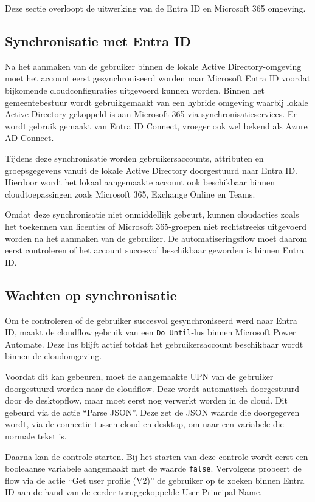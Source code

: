 Deze sectie overloopt de uitwerking van de Entra ID en Microsoft 365 omgeving. 

\subsection{Synchronisatie met Entra ID}

Na het aanmaken van de gebruiker binnen de lokale Active Directory-omgeving moet het account eerst gesynchroniseerd worden naar Microsoft Entra ID voordat bijkomende cloudconfiguraties uitgevoerd kunnen worden. Binnen het gemeentebestuur wordt gebruikgemaakt van een hybride omgeving waarbij lokale Active Directory gekoppeld is aan Microsoft 365 via synchronisatieservices. Er wordt gebruik gemaakt van Entra ID Connect, vroeger ook wel bekend als Azure AD Connect. 

Tijdens deze synchronisatie worden gebruikersaccounts, attributen en groepsgegevens vanuit de lokale Active Directory doorgestuurd naar Entra ID. Hierdoor wordt het lokaal aangemaakte account ook beschikbaar binnen cloudtoepassingen zoals Microsoft 365, Exchange Online en Teams.

Omdat deze synchronisatie niet onmiddellijk gebeurt, kunnen cloudacties zoals het toekennen van licenties of Microsoft 365-groepen niet rechtstreeks uitgevoerd worden na het aanmaken van de gebruiker. De automatiseringsflow moet daarom eerst controleren of het account succesvol beschikbaar geworden is binnen Entra ID.

\subsection{Wachten op synchronisatie}

Om te controleren of de gebruiker succesvol gesynchroniseerd werd naar Entra ID, maakt de cloudflow gebruik van een \texttt{Do Until}-lus binnen Microsoft Power Automate. Deze lus blijft actief totdat het gebruikersaccount beschikbaar wordt binnen de cloudomgeving.

Voordat dit kan gebeuren, moet de aangemaakte UPN van de gebruiker doorgestuurd worden naar de cloudflow. Deze wordt automatisch doorgestuurd door de desktopflow, maar moet eerst nog verwerkt worden in de cloud. Dit gebeurd via de actie ``Parse JSON''. Deze zet de JSON waarde die doorgegeven wordt, via de connectie tussen cloud en desktop, om naar een variabele die normale tekst is. 

Daarna kan de controle starten. Bij het starten van deze controle wordt eerst een booleaanse variabele aangemaakt met de waarde \texttt{false}. Vervolgens probeert de flow via de actie ``Get user profile (V2)'' de gebruiker op te zoeken binnen Entra ID aan de hand van de eerder teruggekoppelde User Principal Name.

